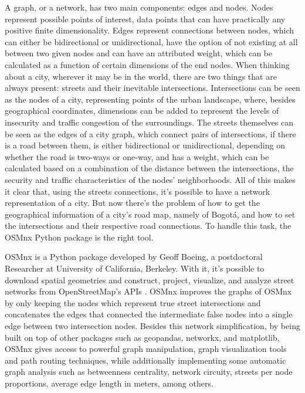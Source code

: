 \documentclass[runningheads]{llncs}
\begin{document}
A graph, or a network, has two main components: edges and nodes. Nodes represent possible points of interest, data points that can have practically any positive finite dimensionality. Edges represent connections between nodes, which can either be bidirectional or unidirectional, have the option of not existing at all between two given nodes and can have an attributed weight, which can be calculated as a function of certain dimensions of the end nodes. 
When thinking about a city, wherever it may be in the world, there are two things that are always present: streets and their inevitable intersections. Intersections can be seen as the nodes of a city, representing points of the urban landscape, where, besides geographical coordinates, dimensions can be added to represent the levels of insecurity and traffic congestion of the surroundings. The streets themselves can be seen as the edges of a city graph, which connect pairs of intersections, if there is a road between them, is either bidirectional or unidirectional, depending on whether the road is two-ways or one-way, and has a weight, which can be calculated based on a combination of the distance between the intersections, the security and traffic characteristics of the nodes' neighborhoods. All of this makes it clear that, using the streets connections, it's possible to have a network representation of a city. But now there's the problem of how to get the geographical information of a city's road map, namely of Bogotá, and how to set the intersections and their respective road connections. To handle this task, the OSMnx \cite{geoff_osmnx:_2017} Python package is the right tool.

OSMnx \cite{geoff_osmnx:_2017} is a Python package developed by Geoff Boeing, a postdoctoral Researcher at University of California, Berkeley. With it, it's possible to download spatial geometries and construct, project, visualize, and analyze street networks from OpenStreetMap’s APIs \cite{noauthor_open_nodate}. OSMnx \cite{geoff_osmnx:_2017} improves the graphs of OSMnx by only keeping the nodes which represent true street intersections and concatenates the edges that connected the intermediate false nodes into a single edge between two intersection nodes. Besides this network simplification, by being built on top of other packages such as geopandas, networkx, and matplotlib, OSMnx \cite{geoff_osmnx:_2017} gives access to powerful graph manipulation, graph visualization tools and path routing techniques, while additionally implementing some automatic graph analysis such as betweenness centrality, network circuity, streets per node proportions, average edge length in meters, among others.
\end{document}
